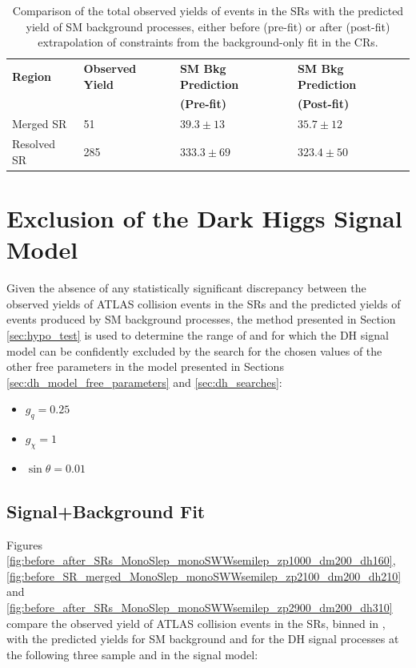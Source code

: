 \begin{table}
\centering
\caption{Comparison of the total observed yields of events in the SRs with the predicted yield of SM background processes, either before (pre-fit) or after (post-fit) extrapolation of constraints from the background-only fit in the CRs.}
\label{tab:pre_post_yields_SR}
\begin{tabular}{l l l l}
\toprule
\textbf{Region} & \textbf{Observed Yield} & \textbf{SM Bkg Prediction} & \textbf{SM Bkg Prediction} \\
 & & \textbf{(Pre-fit)} & \textbf{(Post-fit)} \\
\midrule
\midrule
Merged SR & 51 & $39.3 \pm 13$ & $35.7 \pm 12$ \\
\midrule
Resolved SR & 285 & $333.3\pm 69$ & $323.4 \pm 50$ \\
\bottomrule
\end{tabular}
\end{table}

\section{Exclusion of the Dark Higgs Signal Model}

Given the absence of any statistically significant discrepancy between the observed yields of ATLAS collision events in the SRs and the predicted yields of events produced by SM background processes, the method presented in Section \ref{sec:hypo_test} is used to determine the range of \ms and \mZp for which the DH signal model can be confidently excluded by the search for the chosen values of the other free parameters in the model presented in Sections \ref{sec:dh_model_free_parameters} and \ref{sec:dh_searches}:

\begin{itemize}
\item \(g_q=0.25\)
\item \(g_\chi=1\)
\item \(\sin\theta=0.01\)
\end{itemize}

\subsection{Signal+Background Fit}

Figures \ref{fig:before_after_SRs_MonoSlep_monoSWWsemilep_zp1000_dm200_dh160}, \ref{fig:before_SR_merged_MonoSlep_monoSWWsemilep_zp2100_dm200_dh210} and \ref{fig:before_after_SRs_MonoSlep_monoSWWsemilep_zp2900_dm200_dh310} compare the observed yield of ATLAS collision events in the SRs, binned in \minms, with the predicted yields for SM background and for the DH signal processes at the following three sample \ms and \mZp in the signal model:

